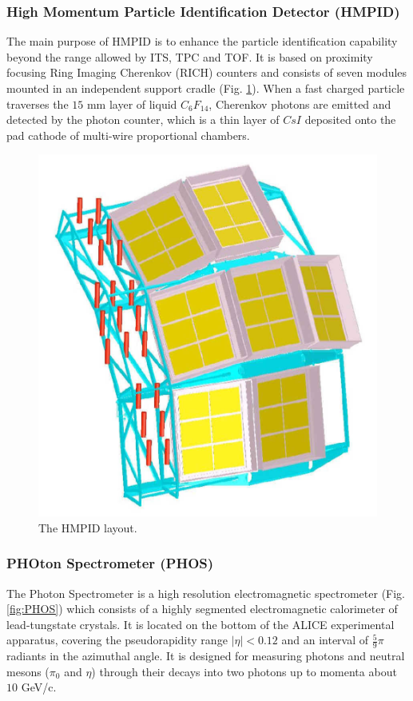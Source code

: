 \subsubsection{High Momentum Particle Identification Detector (HMPID)}
The main purpose of HMPID is to enhance the particle identification capability beyond the range allowed by ITS, TPC and TOF. 
It is based on proximity focusing Ring Imaging Cherenkov (RICH) counters and consists of seven modules mounted in an independent support cradle (Fig. \ref{fig:HMPID}). 
When a fast charged particle traverses the $15$ mm layer of liquid $C_6F_{14}$, Cherenkov photons are emitted and detected by the photon counter, which is a thin layer of $CsI$ deposited onto the pad cathode of multi-wire proportional chambers.

\begin{figure}[!h]
\begin{center}
\includegraphics[width=0.4\linewidth]{Chapters/Introduction/Figs/hmpid.pdf}
\caption{The HMPID layout.}
\label{fig:HMPID}
\end{center}
\end{figure}

\subsubsection{PHOton Spectrometer (PHOS)}
The Photon Spectrometer is a high resolution electromagnetic spectrometer (Fig. \ref{fig:PHOS}) which consists of a highly segmented electromagnetic calorimeter of lead-tungstate crystals.
It is located on the bottom of the ALICE experimental apparatus, covering the pseudorapidity range $|\eta| < 0.12$ and an interval of $\frac{5}{9}\pi$ radiants in the azimuthal angle.
It is designed for measuring photons and neutral mesons ($\pi_0$ and $\eta$) through their decays into two photons up to momenta about $10$ GeV/c.

